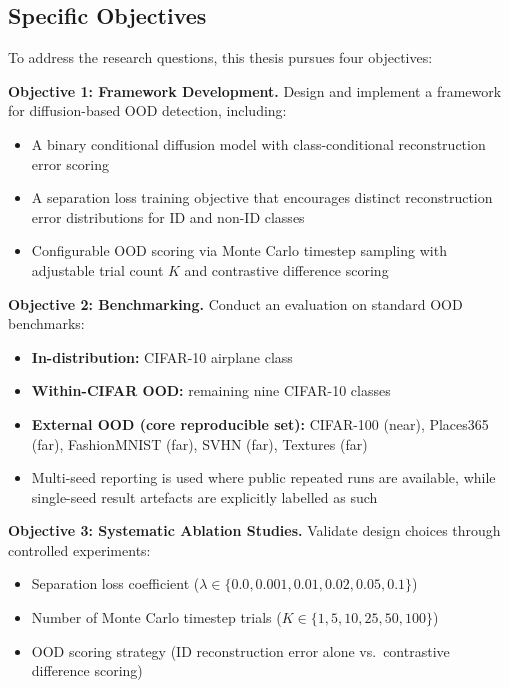 \subsection{Specific Objectives}
\label{sec:intro:specific-objectives}

To address the research questions, this thesis pursues four objectives:

\textbf{Objective 1: Framework Development.} Design and implement a framework for diffusion-based OOD detection, including:

\begin{itemize}
    \item A binary conditional diffusion model with class-conditional reconstruction error scoring
    \item A separation loss training objective that encourages distinct reconstruction error distributions for ID and non-ID classes
    \item Configurable OOD scoring via Monte Carlo timestep sampling with adjustable trial count $K$ and contrastive difference scoring
\end{itemize}

\textbf{Objective 2: Benchmarking.} Conduct an evaluation on standard OOD benchmarks:

\begin{itemize}
    \item \textbf{In-distribution:} CIFAR-10 airplane class~\citep{krizhevsky2009learning}
    \item \textbf{Within-CIFAR OOD:} remaining nine CIFAR-10 classes
    \item \textbf{External OOD (core reproducible set):} CIFAR-100 (near), Places365 (far), FashionMNIST (far), SVHN (far), Textures (far)
    \item Multi-seed reporting is used where public repeated runs are available, while single-seed result artefacts are explicitly labelled as such
\end{itemize}

\textbf{Objective 3: Systematic Ablation Studies.} Validate design choices through controlled experiments:

\begin{itemize}
    \item Separation loss coefficient ($\lambda \in \{0.0, 0.001, 0.01, 0.02, 0.05, 0.1\}$)
    \item Number of Monte Carlo timestep trials ($K \in \{1, 5, 10, 25, 50, 100\}$)
    \item OOD scoring strategy (ID reconstruction error alone vs.\ contrastive difference scoring)
\end{itemize}

